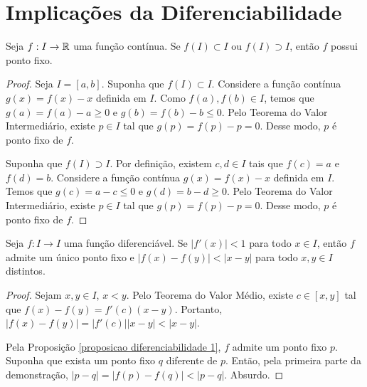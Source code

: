 \section{Implicações da Diferenciabilidade}


\begin{proposition}
\label{proposicao diferenciabilidade 1}
Seja $f: I \to \mathbb{R}$ uma função contínua. Se $f(I) \subset I$ ou $f(I) \supset I$, então $f$ possui ponto fixo.
\end{proposition}

\begin{proof}
Seja $I = [a, b]$. Suponha que $f(I) \subset I$. Considere a função contínua $g(x) = f(x) - x$ definida em $I$. Como $f(a), f(b) \in I$, temos que $g(a) = f(a) - a \geq 0$ e $g(b) = f(b) - b \leq 0$. Pelo Teorema do Valor Intermediário, existe $p \in I$ tal que $g(p) = f(p) -p = 0$. Desse modo, $p$ é ponto fixo de $f$.

Suponha que $f(I) \supset I$. Por definição, existem $c, d \in I$ tais que $f(c) = a$ e$f(d) = b$. Considere a função contínua $g(x) = f(x) - x$ definida em $I$. Temos que $g(c) = a - c \leq 0$ e $g(d) = b - d \geq 0$. Pelo Teorema do Valor Intermediário, existe $p \in I$ tal que $g(p) = f(p) - p = 0$. Desse modo, $p$ é ponto fixo de $f$.
\end{proof}

\begin{theorem}
Seja $f:I \to I$ uma função diferenciável. Se $|f'(x)|<1$ para todo $x \in I$, então $f$ admite um único ponto fixo e $|f(x) - f(y)| < |x - y|$ para todo $x, y \in I$ distintos.
\end{theorem}

\begin{proof}
Sejam $x, y \in I$, $x < y$. Pelo Teorema do Valor Médio, existe $c \in [x, y]$ tal que $f(x) - f(y) = f'(c)(x - y)$. Portanto, $|f(x) - f(y)| = |f'(c)||x - y| < |x - y|$.

Pela Proposição \ref{proposicao diferenciabilidade 1}, $f$ admite um ponto fixo $p$. Suponha que exista um ponto fixo $q$ diferente de $p$. Então, pela primeira parte da demonstração, $|p - q| = |f(p) - f(q)| < |p - q|$. Absurdo.
\end{proof}


